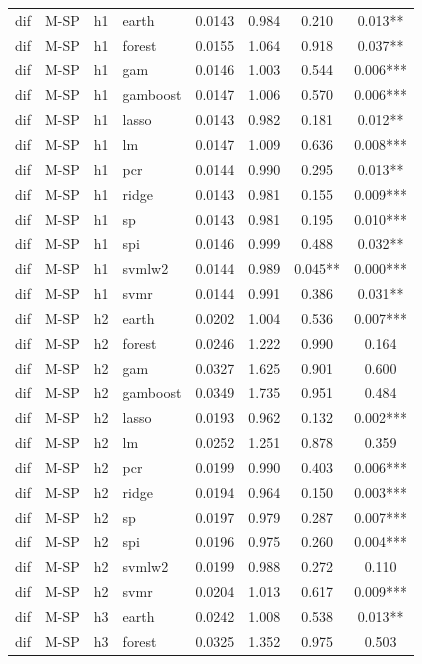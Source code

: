 \begin{ThreePartTable}
\begin{longtable}[t]{llclcccc}
dif & M-SP & h1 & earth & 0.0143 & 0.984 & 0.210 & 0.013**\\
dif & M-SP & h1 & forest & 0.0155 & 1.064 & 0.918 & 0.037**\\
dif & M-SP & h1 & gam & 0.0146 & 1.003 & 0.544 & 0.006***\\
dif & M-SP & h1 & gamboost & 0.0147 & 1.006 & 0.570 & 0.006***\\
dif & M-SP & h1 & lasso & 0.0143 & 0.982 & 0.181 & 0.012**\\
dif & M-SP & h1 & lm & 0.0147 & 1.009 & 0.636 & 0.008***\\
dif & M-SP & h1 & pcr & 0.0144 & 0.990 & 0.295 & 0.013**\\
dif & M-SP & h1 & ridge & 0.0143 & 0.981 & 0.155 & 0.009***\\
dif & M-SP & h1 & sp & 0.0143 & 0.981 & 0.195 & 0.010***\\
dif & M-SP & h1 & spi & 0.0146 & 0.999 & 0.488 & 0.032**\\
dif & M-SP & h1 & svmlw2 & 0.0144 & 0.989 & 0.045** & 0.000***\\
dif & M-SP & h1 & svmr & 0.0144 & 0.991 & 0.386 & 0.031**\\
\addlinespace
dif & M-SP & h2 & earth & 0.0202 & 1.004 & 0.536 & 0.007***\\
dif & M-SP & h2 & forest & 0.0246 & 1.222 & 0.990 & 0.164\\
dif & M-SP & h2 & gam & 0.0327 & 1.625 & 0.901 & 0.600\\
dif & M-SP & h2 & gamboost & 0.0349 & 1.735 & 0.951 & 0.484\\
dif & M-SP & h2 & lasso & 0.0193 & 0.962 & 0.132 & 0.002***\\
dif & M-SP & h2 & lm & 0.0252 & 1.251 & 0.878 & 0.359\\
dif & M-SP & h2 & pcr & 0.0199 & 0.990 & 0.403 & 0.006***\\
dif & M-SP & h2 & ridge & 0.0194 & 0.964 & 0.150 & 0.003***\\
dif & M-SP & h2 & sp & 0.0197 & 0.979 & 0.287 & 0.007***\\
dif & M-SP & h2 & spi & 0.0196 & 0.975 & 0.260 & 0.004***\\
dif & M-SP & h2 & svmlw2 & 0.0199 & 0.988 & 0.272 & 0.110\\
dif & M-SP & h2 & svmr & 0.0204 & 1.013 & 0.617 & 0.009***\\
\addlinespace
dif & M-SP & h3 & earth & 0.0242 & 1.008 & 0.538 & 0.013**\\
dif & M-SP & h3 & forest & 0.0325 & 1.352 & 0.975 & 0.503\\

\end{longtable}
\end{ThreePartTable}
